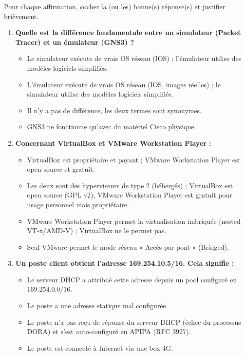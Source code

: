 \documentclass[11pt]{article}
\begin{document}
\begin{exercice}
Pour chaque affirmation, cocher la (ou les) bonne(s) réponse(s) et justifier brièvement.
\begin{enumerate}
    \item \textbf{Quelle est la différence fondamentale entre un simulateur (Packet Tracer) et un émulateur (GNS3) ?}
    \begin{itemize}
        \item[A.] Le simulateur exécute de vrais OS réseau (IOS) ; l'émulateur utilise des modèles logiciels simplifiés.
        \item[B.] L'émulateur exécute de vrais OS réseau (IOS, images réelles) ; le simulateur utilise des modèles logiciels simplifiés.
        \item[C.] Il n'y a pas de différence, les deux termes sont synonymes.
        \item[D.] GNS3 ne fonctionne qu'avec du matériel Cisco physique.
    \end{itemize}
    \item \textbf{Concernant VirtualBox et VMware Workstation Player :}
    \begin{itemize}
        \item[A.] VirtualBox est propriétaire et payant ; VMware Workstation Player est open source et gratuit.
        \item[B.] Les deux sont des hyperviseurs de type 2 (hébergés) ; VirtualBox est open source (GPL v2), VMware Workstation Player est gratuit pour usage personnel mais propriétaire.
        \item[C.] VMware Workstation Player permet la virtualisation imbriquée (nested VT-x/AMD-V) ; VirtualBox ne le permet pas.
        \item[D.] Seul VMware permet le mode réseau « Accès par pont » (Bridged).
    \end{itemize}
    \item \textbf{Un poste client obtient l'adresse 169.254.10.5/16. Cela signifie :}
    \begin{itemize}
        \item[A.] Le serveur DHCP a attribué cette adresse depuis un pool configuré en 169.254.0.0/16.
        \item[B.] Le poste a une adresse statique mal configurée.
        \item[C.] Le poste n'a pas reçu de réponse du serveur DHCP (échec du processus DORA) et s'est auto-configuré en APIPA (RFC 3927).
        \item[D.] Le poste est connecté à Internet via une box 4G.
    \end{itemize}
\end{enumerate}
\end{exercice}
\end{document}
